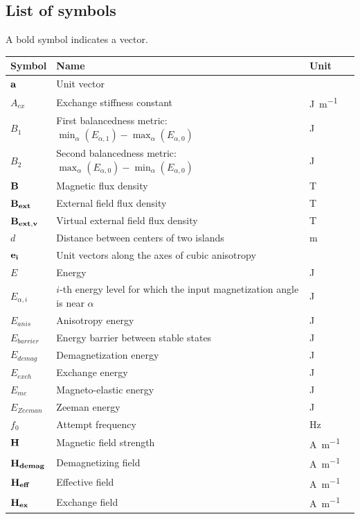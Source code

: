 \documentclass[11pt,a4paper,english]{article}
\begin{document}
\subsection*{List of symbols}
A bold symbol indicates a vector.
\begin{longtable}{llll}
\toprule
\bfseries Symbol & \bfseries Name &
\bfseries Unit \\\midrule\endhead
$\vb{a}$ & Unit vector & \\
$A_{ex}$ & Exchange stiffness constant & \si{\joule\per\metre} \\
$B_1$ & First balancedness metric: $\min_\alpha(E_{\alpha,1}) - \max_\alpha(E_{\alpha,0})$ & \si{\joule} \\
$B_2$ & Second balancedness metric: $\max_\alpha(E_{\alpha,0}) - \min_\alpha(E_{\alpha,0})$ & \si{\joule} \\
$\vb{B}$ & Magnetic flux density & \si{\tesla} \\
$\vb{B_{ext}}$ & External field flux density & \si{\tesla} \\
$\vb{B_{ext,v}}$ & Virtual external field flux density & \si{\tesla} \\
$d$ & Distance between centers of two islands & \si{\metre} \\
$\vb{e_i}$ & Unit vectors along the axes of cubic anisotropy &  \\
$E$ & Energy & \si{\joule} \\
$E_{\alpha,i}$ & $i$-th energy level for which the input magnetization angle is near $\alpha$ & \si{\joule} \\ 
$E_{anis}$ & Anisotropy energy & \si{\joule} \\
$E_{barrier}$ & Energy barrier between stable states & \si{\joule} \\
$E_{demag}$ & Demagnetization energy & \si{\joule} \\
$E_{exch}$ & Exchange energy & \si{\joule} \\
$E_{me}$ & Magneto-elastic energy & \si{\joule} \\
$E_{Zeeman}$ & Zeeman energy & \si{\joule} \\
$f_0$ & Attempt frequency & \si{\hertz} \\
$\vb{H}$ & Magnetic field strength & \si{\ampere\per\metre} \\
$\vb{H_{demag}}$ & Demagnetizing field & \si{\ampere\per\metre} \\
$\vb{H_{eff}}$ & Effective field & \si{\ampere\per\metre} \\
$\vb{H_{ex}}$ & Exchange field & \si{\ampere\per\metre} \\

\end{longtable}
\end{document}
